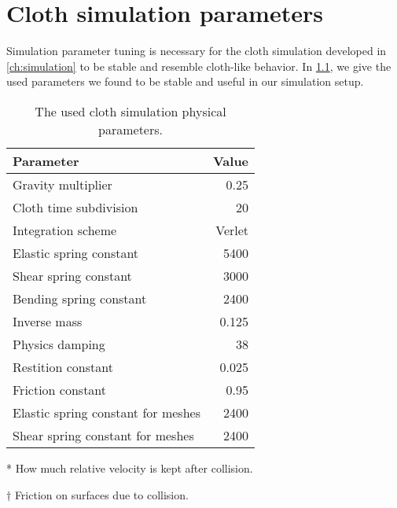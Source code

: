 \documentclass[\home/main.tex]{subfiles}
\begin{document}
\chapter{Cloth simulation parameters}\label{appx:cloth_sim_params}
Simulation parameter tuning is necessary for the cloth simulation developed in \cref{ch:simulation} to be stable and resemble cloth-like behavior. In \cref{table:cloth_sim_params}, we give the used parameters we found to be stable and useful in our simulation setup.

\begin{table}[htb]
  \centering
  \begin{threeparttable}
  \caption{The used cloth simulation physical parameters.}
  \begin{tabular}[t]{@{} l r @{}} 
    \toprule
    Parameter                           &   Value	 						\\
    \midrule
    Gravity multiplier     	            & 0.25				\\
    Cloth time subdivision     	        & 20   				\\
    Integration scheme      	          & Verlet   				\\
    Elastic spring constant             & 5400   				\\
    Shear spring constant      	        & 3000   				\\
    Bending spring constant             & 2400   				\\
    Inverse mass       	                & 0.125   				\\
    Physics damping      	              & 38   				\\
    Restition constant\tnote{*}   	    & 0.025   				\\
    Friction constant\tnote{$\dagger$}    	    & 0.95   				\\
    Elastic spring constant for meshes  & 2400   				\\
    Shear spring constant for meshes    & 2400   				\\

    \bottomrule
  \end{tabular}
  \begin{tablenotes}\footnotesize
    \item[*] How much relative velocity is kept after collision.
    \item[$\dagger$] Friction on surfaces due to collision.
  \end{tablenotes}

  \label{table:cloth_sim_params}
  \end{threeparttable}
  \end{table}
\end{document}
